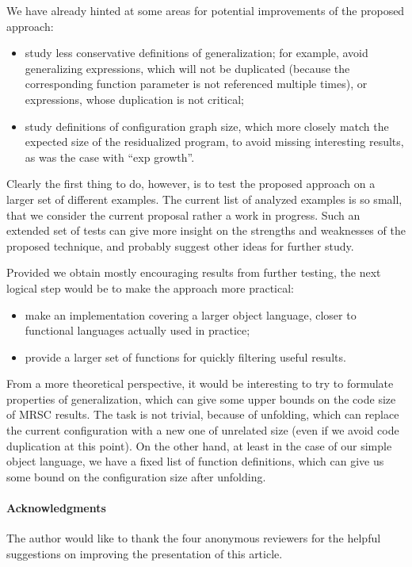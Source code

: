 \documentclass[submission,copyright,creativecommons]{eptcs}
\begin{document}
We have already hinted at some areas for potential improvements of the proposed approach:
\begin{itemize}
  \item study less conservative definitions of generalization; for example, avoid generalizing
    expressions, which will not be duplicated (because the corresponding function parameter is
    not referenced multiple times), or expressions, whose duplication is not critical;
  \item study definitions of configuration graph size, which more closely match the expected
    size of the residualized program, to avoid missing interesting results, as was the case
    with ``exp growth''.
\end{itemize}
Clearly the first thing to do, however, is to test the proposed approach on a larger set of
different examples.
The current list of analyzed examples is so small, that we consider the current proposal
rather a work in progress.
Such an extended set of tests can give more insight on the strengths and weaknesses of the
proposed technique, and probably suggest other ideas for further study.

Provided we obtain mostly encouraging results from further testing, the next logical 
step would be to make the approach more practical:
\begin{itemize}
  \item make an implementation covering a larger object language, closer to functional languages
    actually used in practice;
  \item provide a larger set of functions for quickly filtering useful results.
\end{itemize}

From a more theoretical perspective, it would be interesting to try to formulate properties
of generalization, which can give some upper bounds on the code size of MRSC results.
The task is not trivial, because of unfolding, which can replace the current configuration
with a new one of unrelated size (even if we avoid code duplication at this point).
On the other hand, at least in the case of our simple object language, we have a fixed
list of function definitions, which can give us some bound on the configuration size
after unfolding.

\paragraph{Acknowledgments}
The author would like to thank the four anonymous reviewers for
the helpful suggestions on improving the presentation of
this article.
\end{document}
